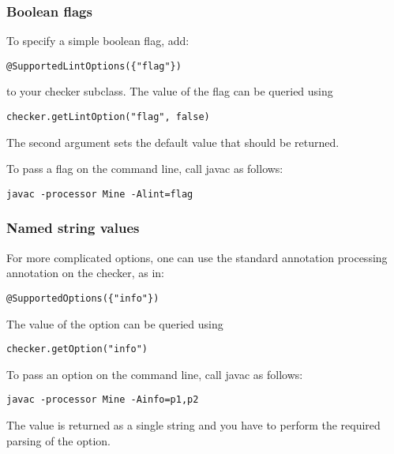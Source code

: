 \subsubsection{Boolean flags\label{providing-command-line-options-boolean-flags}}

To specify a simple boolean flag, add:

\begin{Verbatim}
@SupportedLintOptions({"flag"})
\end{Verbatim}

to your checker subclass.
The value of the flag can be queried using

\begin{Verbatim}
checker.getLintOption("flag", false)
\end{Verbatim}

The second argument sets the default value that should be returned.

To pass a flag on the command line, call javac as follows:

\begin{Verbatim}
javac -processor Mine -Alint=flag
\end{Verbatim}


\subsubsection{Named string values\label{providing-command-line-options-named-string-values}}

For more complicated options, one can use the standard annotation
processing  annotation on the checker, as in:

\begin{Verbatim}
@SupportedOptions({"info"})
\end{Verbatim}

The value of the option can be queried using

\begin{Verbatim}
checker.getOption("info")
\end{Verbatim}

To pass an option on the command line, call javac as follows:

\begin{Verbatim}
javac -processor Mine -Ainfo=p1,p2
\end{Verbatim}

The value is returned as a single string and you have to perform the
required parsing of the option.





